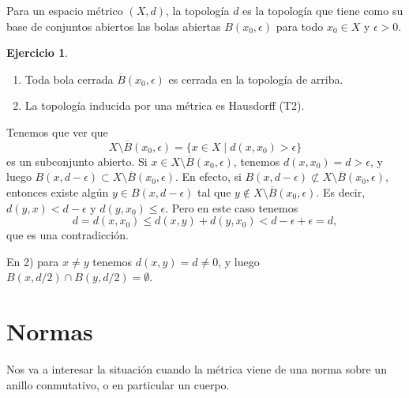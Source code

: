 \documentclass{article}
\numberwithin{equation}{section}
\theoremstyle{definition}
\newtheorem{ejerc}{Ejercicio}
\begin{document}
\begin{definicion}
  Para un espacio métrico $(X,d)$, la topología 
  $d$ es la topología que tiene como su base de conjuntos abiertos las bolas
  abiertas $B (x_0,\epsilon)$ para todo $x_0\in X$ y $\epsilon > 0$.
\end{definicion}

\begin{ejerc}
  \label{ejerc:bola-cerrada-es-cerrada}
  ~

  \begin{enumerate}
  \item[1)] Toda bola cerrada $\overline{B} (x_0,\epsilon)$ es cerrada en la
    topología de arriba.

  \item[2)] La topología inducida por una métrica es Hausdorff (T2).
  \end{enumerate}

  \ifdefined\solutions\begin{solucion}
    Tenemos que ver que
    \[ X\setminus \overline{B} (x_0,\epsilon) =
       \{ x\in X \mid d (x,x_0) > \epsilon \} \]
    es un subconjunto abierto. Si
    $x \in X\setminus \overline{B} (x_0,\epsilon)$, tenemos
    $d (x,x_0) = d > \epsilon$, y luego
    $B (x,d - \epsilon) \subset X\setminus \overline{B} (x_0,\epsilon)$.
    En efecto, si
    $B (x,d - \epsilon) \not\subset X\setminus \overline{B} (x_0,\epsilon)$,
    entonces existe algún $y \in B (x,d - \epsilon)$ tal que
    $y \notin X\setminus \overline{B} (x_0,\epsilon)$.
    Es decir, $d (y,x) < d-\epsilon$ y $d (y,x_0) \le \epsilon$. Pero en este
    caso tenemos
    $$d = d (x,x_0) \le d (x,y) + d (y,x_0) < d-\epsilon + \epsilon = d,$$
    que es una contradicción.

    En 2) para $x \ne y$ tenemos $d (x,y) = d \ne 0$, y luego
    $B (x,d/2) \cap B (y,d/2) = \emptyset$.
  \end{solucion}\fi
\end{ejerc}


\section{Normas}

Nos va a interesar la situación cuando la métrica viene de una norma sobre
un anillo conmutativo, o en particular un cuerpo.
\end{document}
